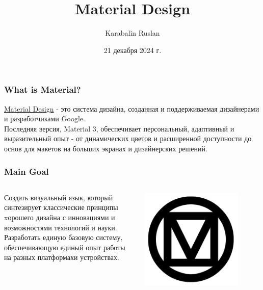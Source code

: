 \documentclass[12pt]{beamer}
\title{Material Design}
\author{Karabalin Ruslan}
\date{21 декабря 2024 г.}
\begin{document}
	
	\begin{frame}

		\titlepage

	\end{frame}
	
	\begin{frame}
		\frametitle{What is Material?}
		
		\href{https://m3.material.io/}{Material Design} - это система дизайна,
        созданная и поддерживаемая дизайнерами и разработчиками Google. \\
		
		Последняя версия, Material 3,
        обеспечивает персональный, адаптивный
        и выразительный опыт - от динамических цветов
        и расширенной доступности до основ
        для макетов на больших экранах и дизайнерских решений.
		
	\end{frame}
	
	\begin{frame}
		\frametitle{Main Goal}

        \begin{columns}
            \begin{column}{0.5\textwidth}
                Создать визуальный язык,
                который синтезирует классические принципы
                xорошего дизайна с инновациями
                и возможностями технологий и науки. \\

                Разработать единую базовую систему,
                обеспечивающую единый опыт работы
                на разных платформахи устройствах.
            \end{column}
            
            \begin{column}{0.5\textwidth}
                \includegraphics[width=0.8\textwidth]{md.png}
            \end{column}

        \end{columns}

	\end{frame}
\end{document}
